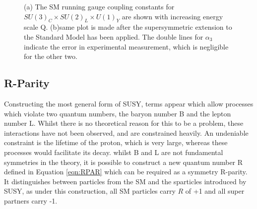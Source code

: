 \begin{figure}
\centering
{}
\caption[The running gauge coupling constants for $SU(3)_{C} \times SU(2)_{L} \times U(1)_{Y}$ in the SM and SUSY cases.]{\label{fig:couple}(a) The SM running gauge coupling constants for $SU(3)_{C} \times SU(2)_{L} \times U(1)_{Y}$ are shown with increasing energy scale Q. (b)same plot is made after the supersymmetric extension to the Standard Model has been applied. The double lines for $\alpha_{3}$ indicate the error in experimental  measurement, which is negligible for the other two.~\cite{PeskinBSM}}
\end{figure}



\subsection{R-Parity}

Constructing the most general form of SUSY, terms appear which allow processes which violate two quantum numbers, the baryon number B and the lepton number L. Whilst there is no theoretical reason for this to be a problem, these interactions have not been observed, and are constrained heavily. An undeniable constraint is the lifetime of the proton, which is very large, whereas these processes would facilitate its decay. whilst B and L are not fundamental symmetries in the theory, it is possible to construct a new quantum number R defined in Equation \ref{eqn:RPAR} which can be required as a symmetry R-parity\cite{terning}. It distinguishes between particles from the SM and the sparticles introduced by SUSY, as under this construction, all SM particles carry $R$ of +1 and all super partners carry -1. 

